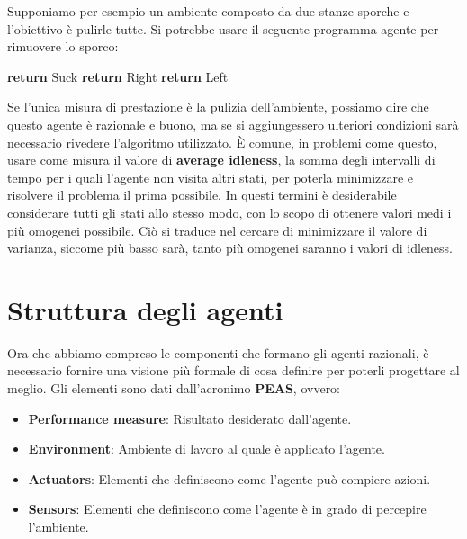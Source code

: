 \noindent Supponiamo per esempio un ambiente composto da due stanze sporche e l'obiettivo è pulirle tutte. Si potrebbe usare il seguente programma
agente per rimuovere lo sporco: \begin{algorithm}[h]
    \caption{Reflex-Vacuum-Agent(location, status) \textbf{returns} action}
    \begin{algorithmic}[i]
          \textbf{return} Suck
          \textbf{return} Right
          \textbf{return} Left
         \EndIf
    \end{algorithmic}
\end{algorithm}

\noindent Se l'unica misura di prestazione è la pulizia dell'ambiente, possiamo dire che questo agente è razionale e buono, ma se si aggiungessero
ulteriori condizioni sarà necessario rivedere l'algoritmo utilizzato. È comune, in problemi come questo, usare come misura il valore di \textbf{average
idleness}, la somma degli intervalli di tempo per i quali l'agente non visita altri stati, per poterla minimizzare e risolvere il problema il prima
possibile. In questi termini è desiderabile considerare tutti gli stati allo stesso modo, con lo scopo di ottenere valori medi i più omogenei possibile.
Ciò si traduce nel cercare di minimizzare il valore di varianza, siccome più basso sarà, tanto più omogenei saranno i valori di idleness.

%

\section{Struttura degli agenti}
Ora che abbiamo compreso le componenti che formano gli agenti razionali, è necessario fornire una visione più formale di cosa definire per poterli
progettare al meglio. Gli elementi sono dati dall'acronimo \textbf{PEAS}, ovvero: \begin{itemize}
    \item \textbf{Performance measure}: Risultato desiderato dall'agente.
    \item \textbf{Environment}: Ambiente di lavoro al quale è applicato l'agente.
    \item \textbf{Actuators}: Elementi che definiscono come l'agente può compiere azioni.
    \item \textbf{Sensors}: Elementi che definiscono come l'agente è in grado di percepire l'ambiente.
\end{itemize}

